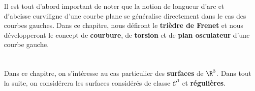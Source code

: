 Il est tout d'abord important de noter que la notion de longueur d'arc et d'abcisse curviligne d'une courbe plane se généralise directement dans le cas des courbes gauches. Dans ce chapitre, nous défiront le \textbf{trièdre de Frenet} et nous développeront le concept de \textbf{courbure}, de \textbf{torsion} et de \textbf{plan osculateur} d'une courbe gauche.


\chapter*{} %

Dans ce chapitre, on s'intéresse au cas particulier des \textbf{surfaces} de \(\R^3\). Dans tout la suite, on considérera les surfaces considérés de classe \(\mathcal{C}^1\) et \textbf{régulières}.

